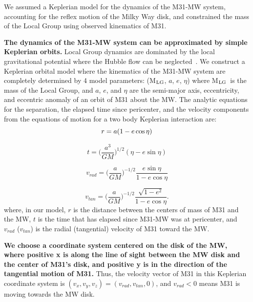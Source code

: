\documentclass[twocolumn]{aastex631}
\newcommand{\mlg}{M$_{\rm LG}$}
\begin{document}
We assumed a Keplerian model for the dynamics of the M31-MW system, accounting for the reflex motion of the Milky Way disk, and constrained the mass of the Local Group using observed kinematics of M31.  

\textbf{The dynamics of the M31-MW system can be approximated by simple Keplerian orbits.}
Local Group dynamics are dominated by the local gravitational potential where the Hubble flow can be neglected~\cite{}. We construct a Keplerian orbital model where the kinematics of the M31-MW system are completely determined by 4 model parameters: (\mlg, $a$, $e$, $\eta$) where \mlg\ is the mass of the Local Group, and $a$, $e$, and $\eta$ are the semi-major axis, eccentricity, and eccentric anomaly of an orbit of M31 about the MW. The analytic equations for the separation, the elapsed time since pericenter, and the velocity components from the equations of motion for a two body Keplerian interaction are:
\begin{equation}\label{eq:r}
  r = a(1-e\cos\eta)\\
\end{equation}

\begin{equation}\label{eq:t}
  t=\bigg(\frac{a^3}{GM}\bigg)^{1/2}(\eta-e\sin\eta)
\end{equation}

\begin{equation}\label{eq:vrad}
  v_{rad} = \bigg( \frac{a}{GM} \bigg)^{-1/2} \frac{e\sin\eta}{1-e\cos\eta}
\end{equation}

\begin{equation}\label{eq:vtan}
  v_{tan}= \bigg( \frac{a}{GM} \bigg)^{-1/2} \frac{\sqrt{1-e^2}}{1-e\cos\eta}.
\end{equation}
where, in our model, $r$ is the distance between the centers of mass of M31 and the MW, $t$ is the time that has elapsed since M31-MW was at pericenter, and $v_{rad}$ ($v_{tan}$) is the radial (tangential) velocity of M31 toward the MW. 

\textbf{We choose a coordinate system centered on the disk of the MW, where positive x is along the line of sight between the MW disk and the center of M31's disk, and positive y is in the direction of the tangential motion of M31.} Thus, the velocity vector of M31 in this Keplerian coordinate system is $(v_x, v_y, v_z) =(v_{rad},v_{tan},0)$, and $v_{rad}<0$ means M31 is moving towards the MW disk. 
\end{document}
